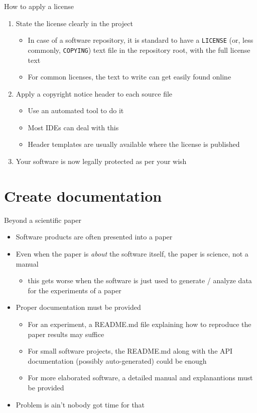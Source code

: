 \documentclass[presentation]{beamer}
\begin{document}
\begin{frame}{How to apply a license}
    \begin{enumerate}
        \item State the license clearly in the project
        \begin{itemize}
            \item In case of a software repository, it is standard to have a \texttt{LICENSE} (or, less commonly, \texttt{COPYING}) text file in the repository root, with the full license text
            \item For common licenses, the text to write can get easily found online
        \end{itemize}
        \item Apply a copyright notice header to each source file
        \begin{itemize}
            \item Use an automated tool to do it
            \item Most IDEs can deal with this
            \item Header templates are usually available where the license is published
        \end{itemize}
        \item Your software is now legally protected as per your wish
    \end{enumerate}
\end{frame}

\section{Create documentation}

\begin{frame}{Beyond a scientific paper}
    \begin{itemize}
        \item Software products are often presented into a paper
        \item Even when the paper is \textit{about} the software itself, the paper is science, not a manual
        \begin{itemize}
            \item this gets worse when the software is just used to generate / analyze data for the experiments of a paper
        \end{itemize}
        \item Proper documentation must be provided
        \begin{itemize}
            \item For an experiment, a README.md file explaining how to reproduce the paper results may suffice
            \item For small software projects, the README.md along with the API documentation (possibly auto-generated) could be enough
            \item For more elaborated software, a detailed manual and explanantions must be provided
        \end{itemize}
        \item Problem is ain't nobody got time for that
    \end{itemize}
\end{frame}
\end{document}
